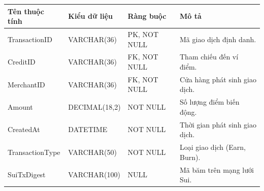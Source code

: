 \begin{table}[htbp]
    \centering
    \renewcommand{\arraystretch}{1.3}
    \begin{tabular}{|p{3cm}|p{3.2cm}|>{\raggedright\arraybackslash}p{3.2cm}|>{\raggedright\arraybackslash}p{4.8cm}|}
        \hline
        \textbf{Tên thuộc tính} & \textbf{Kiểu dữ liệu} & \textbf{Ràng buộc} & \textbf{Mô tả} \\ \hline
        TransactionID & VARCHAR(36) & PK, NOT NULL & Mã giao dịch định danh. \\ \hline
        CreditID & VARCHAR(36) & FK, NOT NULL & Tham chiếu đến ví điểm. \\ \hline
        MerchantID & VARCHAR(36) & FK, NOT NULL & Cửa hàng phát sinh giao dịch. \\ \hline
        Amount & DECIMAL(18,2) & NOT NULL & Số lượng điểm biến động. \\ \hline
        CreatedAt & DATETIME & NOT NULL & Thời gian phát sinh giao dịch. \\ \hline
        TransactionType & VARCHAR(50) & NOT NULL & Loại giao dịch (Earn, Burn). \\ \hline
        SuiTxDigest & VARCHAR(100) & NULL & Mã băm trên mạng lưới Sui. \\ \hline
    \end{tabular}
\end{table}
